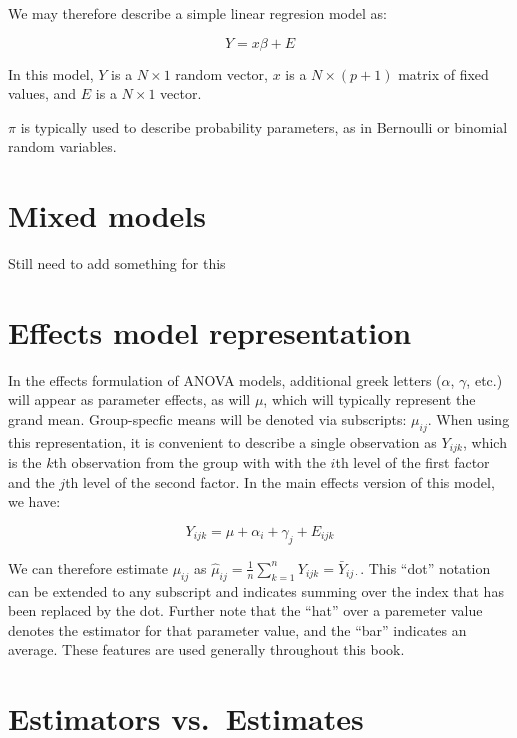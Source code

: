 \documentclass[
]{book}
\theoremstyle{definition}
\theoremstyle{definition}
\theoremstyle{definition}
\theoremstyle{remark}
\begin{document}
We may therefore describe a simple linear regresion model as:

\[Y = x\beta + E\]

In this model, \(Y\) is a \(N\times 1\) random vector, \textbf{\(x\)} is a \(N\times (p + 1)\) matrix of fixed values, and \(E\) is a \(N \times 1\) vector.

\(\pi\) is typically used to describe probability parameters, as in Bernoulli or binomial random variables.

\hypertarget{mixed-models}{%
\section{Mixed models}\label{mixed-models}}

Still need to add something for this

\hypertarget{effects-model-representation}{%
\section{Effects model representation}\label{effects-model-representation}}

In the effects formulation of ANOVA models, additional greek letters (\(\alpha\), \(\gamma\), etc.) will appear as parameter effects, as will \(\mu\), which will typically represent the grand mean. Group-specfic means will be denoted via subscripts: \(\mu_{ij}\). When using this representation, it is convenient to describe a single observation as \(Y_{ijk}\), which is the \(k\)th observation from the group with with the \(i\)th level of the first factor and the \(j\)th level of the second factor. In the main effects version of this model, we have:

\[Y_{ijk} = \mu + \alpha_i + \gamma_j + E_{ijk}\]

We can therefore estimate \(\mu_{ij}\) as \(\hat \mu_{ij} = \frac{1}{n}\sum_{k = 1}^n Y_{ijk} = \bar{Y}_{ij\cdot}\). This ``dot'' notation can be extended to any subscript and indicates summing over the index that has been replaced by the dot. Further note that the ``hat'' over a paremeter value denotes the estimator for that parameter value, and the ``bar'' indicates an average. These features are used generally throughout this book.

\hypertarget{estimators-vs.-estimates}{%
\section{Estimators vs.~Estimates}\label{estimators-vs.-estimates}}
\end{document}
